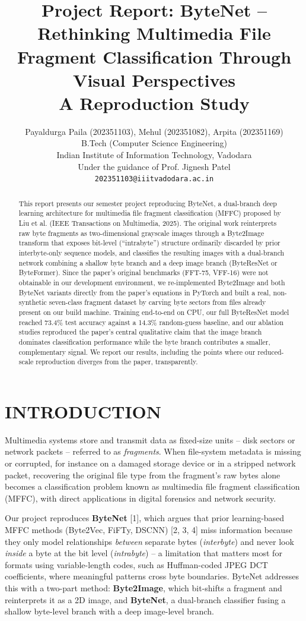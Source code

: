 \documentclass[conference]{IEEEtran}
\title{Project Report: ByteNet -- Rethinking Multimedia File Fragment Classification Through Visual Perspectives \\ \large{A Reproduction Study}}
\author{
    Payaldurga Paila (202351103), Mehul (202351082), Arpita (202351169) \\
    B.Tech (Computer Science Engineering) \\
    Indian Institute of Information Technology, Vadodara \\
    Under the guidance of Prof. Jignesh Patel \\
    \texttt{202351103@iiitvadodara.ac.in}
}
\begin{document}
\maketitle
{\fontsize{11pt}{13pt}\selectfont
\begin{abstract}
This report presents our semester project reproducing ByteNet, a dual-branch deep learning architecture for multimedia file fragment classification (MFFC) proposed by Liu et al. (IEEE Transactions on Multimedia, 2025). The original work reinterprets raw byte fragments as two-dimensional grayscale images through a Byte2Image transform that exposes bit-level (``intrabyte'') structure ordinarily discarded by prior interbyte-only sequence models, and classifies the resulting images with a dual-branch network combining a shallow byte branch and a deep image branch (ByteResNet or ByteFormer). Since the paper's original benchmarks (FFT-75, VFF-16) were not obtainable in our development environment, we re-implemented Byte2Image and both ByteNet variants directly from the paper's equations in PyTorch and built a real, non-synthetic seven-class fragment dataset by carving byte sectors from files already present on our build machine. Training end-to-end on CPU, our full ByteResNet model reached 73.4\% test accuracy against a 14.3\% random-guess baseline, and our ablation studies reproduced the paper's central qualitative claim that the image branch dominates classification performance while the byte branch contributes a smaller, complementary signal. We report our results, including the points where our reduced-scale reproduction diverges from the paper, transparently.
\end{abstract}

\section{INTRODUCTION}

Multimedia systems store and transmit data as fixed-size units -- disk sectors or network packets -- referred to as \emph{fragments}. When file-system metadata is missing or corrupted, for instance on a damaged storage device or in a stripped network packet, recovering the original file type from the fragment's raw bytes alone becomes a classification problem known as multimedia file fragment classification (MFFC), with direct applications in digital forensics and network security.

Our project reproduces \textbf{ByteNet} [1], which argues that prior learning-based MFFC methods (Byte2Vec, FiFTy, DSCNN) [2, 3, 4] miss information because they only model relationships \emph{between} separate bytes (\emph{interbyte}) and never look \emph{inside} a byte at the bit level (\emph{intrabyte}) -- a limitation that matters most for formats using variable-length codes, such as Huffman-coded JPEG DCT coefficients, where meaningful patterns cross byte boundaries. ByteNet addresses this with a two-part method: \textbf{Byte2Image}, which bit-shifts a fragment and reinterprets it as a 2D image, and \textbf{ByteNet}, a dual-branch classifier fusing a shallow byte-level branch with a deep image-level branch.

}
\end{document}
